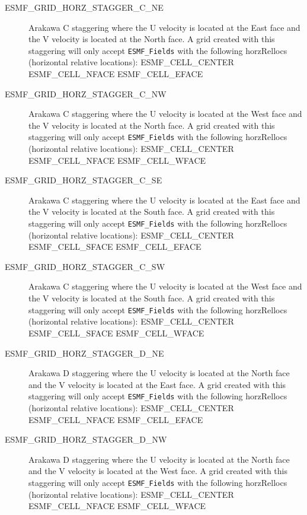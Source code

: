 \begin{description}
    \item [ESMF\_GRID\_HORZ\_STAGGER\_C\_NE]
          Arakawa C staggering where the U velocity is located at the East face
          and the V velocity is located at the North face.  A grid created with
          this staggering will only accept {\tt ESMF\_Fields} with the following
          horzRellocs (horizontal relative locations):
              ESMF\_CELL\_CENTER
              ESMF\_CELL\_NFACE
              ESMF\_CELL\_EFACE

    \item [ESMF\_GRID\_HORZ\_STAGGER\_C\_NW]
          Arakawa C staggering where the U velocity is located at the West face
          and the V velocity is located at the North face.  A grid created with
          this staggering will only accept {\tt ESMF\_Fields} with the following
          horzRellocs (horizontal relative locations):
              ESMF\_CELL\_CENTER
              ESMF\_CELL\_NFACE
              ESMF\_CELL\_WFACE
 
    \item [ESMF\_GRID\_HORZ\_STAGGER\_C\_SE]
          Arakawa C staggering where the U velocity is located at the East face
          and the V velocity is located at the South face.  A grid created with
          this staggering will only accept {\tt ESMF\_Fields} with the following
          horzRellocs (horizontal relative locations):
              ESMF\_CELL\_CENTER
              ESMF\_CELL\_SFACE
              ESMF\_CELL\_EFACE

    \item [ESMF\_GRID\_HORZ\_STAGGER\_C\_SW]
          Arakawa C staggering where the U velocity is located at the West face
          and the V velocity is located at the South face.  A grid created with
          this staggering will only accept {\tt ESMF\_Fields} with the following
          horzRellocs (horizontal relative locations):
              ESMF\_CELL\_CENTER
              ESMF\_CELL\_SFACE
              ESMF\_CELL\_WFACE

    \item [ESMF\_GRID\_HORZ\_STAGGER\_D\_NE]
          Arakawa D staggering where the U velocity is located at the North face
          and the V velocity is located at the East face.  A grid created with
          this staggering will only accept {\tt ESMF\_Fields} with the following
          horzRellocs (horizontal relative locations):
              ESMF\_CELL\_CENTER
              ESMF\_CELL\_NFACE
              ESMF\_CELL\_EFACE

    \item [ESMF\_GRID\_HORZ\_STAGGER\_D\_NW]
          Arakawa D staggering where the U velocity is located at the North face
          and the V velocity is located at the West face.  A grid created with
          this staggering will only accept {\tt ESMF\_Fields} with the following
          horzRellocs (horizontal relative locations):
              ESMF\_CELL\_CENTER
              ESMF\_CELL\_NFACE
              ESMF\_CELL\_WFACE


\end{description}
